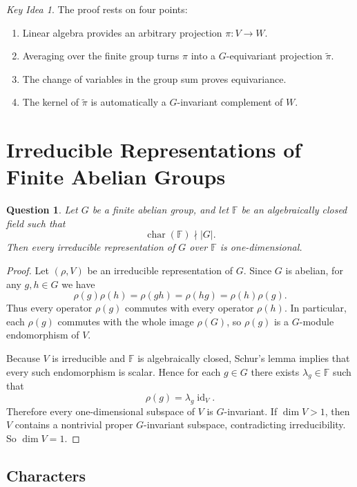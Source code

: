 \documentclass[12pt,a4paper]{ctexart}
\newtheorem{question}{Question}
\theoremstyle{remark}
\newtheorem*{idea}{Key Idea}
\begin{document}
\begin{idea}
The proof rests on four points:
\begin{enumerate}[label=\arabic*.]
  \item Linear algebra provides an arbitrary projection \(\pi:V\to W\).
  \item Averaging over the finite group turns \(\pi\) into a \(G\)-equivariant
  projection \(\widetilde{\pi}\).
  \item The change of variables in the group sum proves equivariance.
  \item The kernel of \(\widetilde{\pi}\) is automatically a \(G\)-invariant
  complement of \(W\).
\end{enumerate}
\end{idea}

\section*{Irreducible Representations of Finite Abelian Groups}

\begin{question}
Let \(G\) be a finite abelian group, and let \(\mathbb{F}\) be an
algebraically closed field such that
\[
  \operatorname{char}(\mathbb{F}) \nmid |G|.
\]
Then every irreducible representation of \(G\) over \(\mathbb{F}\) is
one-dimensional.
\end{question}

\begin{proof}
Let \((\rho,V)\) be an irreducible representation of \(G\).
Since \(G\) is abelian, for any \(g,h\in G\) we have
\[
  \rho(g)\rho(h)=\rho(gh)=\rho(hg)=\rho(h)\rho(g).
\]
Thus every operator \(\rho(g)\) commutes with every operator \(\rho(h)\).
In particular, each \(\rho(g)\) commutes with the whole image \(\rho(G)\), so
\(\rho(g)\) is a \(G\)-module endomorphism of \(V\).

Because \(V\) is irreducible and \(\mathbb{F}\) is algebraically closed,
Schur's lemma implies that every such endomorphism is scalar. Hence for each
\(g\in G\) there exists \(\lambda_g\in\mathbb{F}\) such that
\[
  \rho(g)=\lambda_g \operatorname{id}_V.
\]
Therefore every one-dimensional subspace of \(V\) is \(G\)-invariant. If
\(\dim V>1\), then \(V\) contains a nontrivial proper \(G\)-invariant
subspace, contradicting irreducibility. So \(\dim V=1\).
\end{proof}

\subsection*{Characters}
\end{document}

